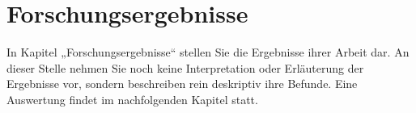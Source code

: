 \section{Forschungsergebnisse}
\label{cha:result}
In Kapitel „Forschungsergebnisse“ stellen Sie die Ergebnisse ihrer Arbeit dar. An dieser Stelle nehmen Sie noch keine Interpretation oder Erläuterung der Ergebnisse vor, sondern beschreiben rein deskriptiv ihre Befunde. Eine Auswertung findet im nachfolgenden Kapitel statt.